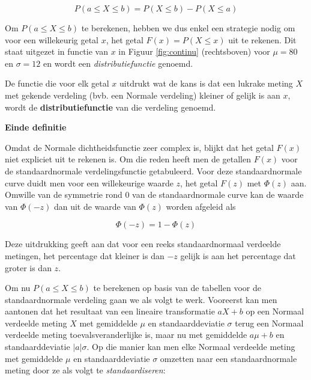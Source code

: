 \documentclass[12pt,dutch,coursenotes]{book}
\theoremstyle{definition}
\theoremstyle{definition}
\theoremstyle{definition}
\theoremstyle{remark}
\let\BeginKnitrBlock\begin \let\EndKnitrBlock\end
\begin{document}
\begin{equation*}
P(a\leq X\leq b)=P(X\leq b)-P(X\leq a)
\end{equation*}

Om \(P(a\leq X\leq b)\) te berekenen, hebben we dus enkel een strategie
nodig om voor een willekeurig getal \(x\), het getal
\(F(x) = P(X \leq x)\) uit te rekenen. Dit staat uitgezet in functie van
\(x\) in Figuur \ref{fig:continu} (rechtsboven) voor \(\mu=80\) en
\(\sigma=12\) en wordt een \emph{distributiefunctie} genoemd.

\BeginKnitrBlock{definition}[distributiefunctie]
\protect\hypertarget{def:unnamed-chunk-48}{}{\label{def:unnamed-chunk-48}
\iffalse (distributiefunctie) \fi{} }De functie die voor elk getal \(x\)
uitdrukt wat de kans is dat een lukrake meting \(X\) met gekende
verdeling (bvb. een Normale verdeling) kleiner of gelijk is aan \(x\),
wordt de \textbf{distributiefunctie} van die verdeling genoemd.

\textbf{Einde definitie}
\EndKnitrBlock{definition}

Omdat de Normale dichtheidsfunctie zeer complex is, blijkt dat het getal
\(F(x)\) niet expliciet uit te rekenen is. Om die reden heeft men de
getallen \(F(x)\) voor de standaardnormale verdelingsfunctie
getabuleerd. Voor deze standaardnormale curve duidt men voor een
willekeurige waarde \(z\), het getal \(F(z)\) met \(\Phi(z)\) aan.
Omwille van de symmetrie rond 0 van de standaardnormale curve kan de
waarde van \(\Phi(-z)\) dan uit de waarde van \(\Phi(z)\) worden
afgeleid als

\begin{equation*}
\Phi(-z)= 1- \Phi(z)
\end{equation*}

Deze uitdrukking geeft aan dat voor een reeks standaardnormaal verdeelde
metingen, het percentage dat kleiner is dan \(-z\) gelijk is aan het
percentage dat groter is dan \(z\).

Om nu \(P(a\leq X\leq b)\) te berekenen op basis van de tabellen voor de
standaardnormale verdeling gaan we als volgt te werk. Vooreerst kan men
aantonen dat het resultaat van een lineaire transformatie \(aX+b\) op
een Normaal verdeelde meting \(X\) met gemiddelde \(\mu\) en
standaarddeviatie \(\sigma\) terug een Normaal verdeelde meting
toevalsveranderlijke is, maar nu met gemiddelde \(a\mu+b\) en
standaarddeviatie \(|a|\sigma\). Op die manier kan men elke Normaal
verdeelde meting met gemiddelde \(\mu\) en standaarddeviatie \(\sigma\)
omzetten naar een standaardnormale meting door ze als volgt te
\emph{standaardiseren}:
\end{document}

